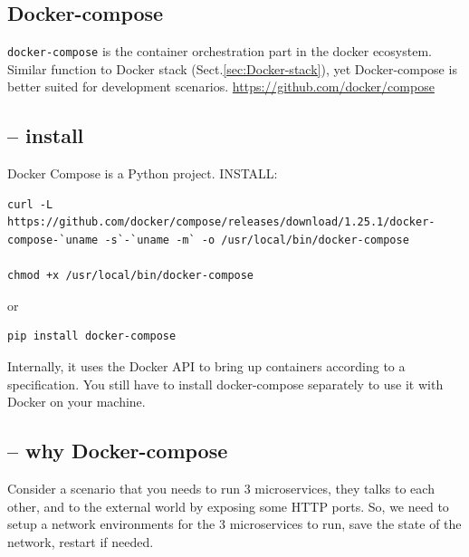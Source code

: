 \subsection{Docker-compose}

\verb!docker-compose! is the container orchestration part in the docker
ecosystem.  Similar function to Docker stack (Sect.\ref{sec:Docker-stack}), yet
Docker-compose is better suited for development scenarios.
\url{https://github.com/docker/compose}


\subsection{-- install }
Docker Compose is a Python project.
INSTALL:

\begin{verbatim}
curl -L https://github.com/docker/compose/releases/download/1.25.1/docker-compose-`uname -s`-`uname -m` -o /usr/local/bin/docker-compose

chmod +x /usr/local/bin/docker-compose
\end{verbatim}
or
\begin{verbatim}
pip install docker-compose
\end{verbatim}

Internally, it uses the Docker API to bring up containers according to a
specification. You still have to install docker-compose separately to use it
with Docker on your machine.

\subsection{-- why Docker-compose}

Consider a scenario that you needs to run 3 microservices, they talks to each
other, and to the external world by exposing some HTTP ports.
So, we need to setup a network environments for the 3 microservices to run, save
the state of the network, restart if needed.

